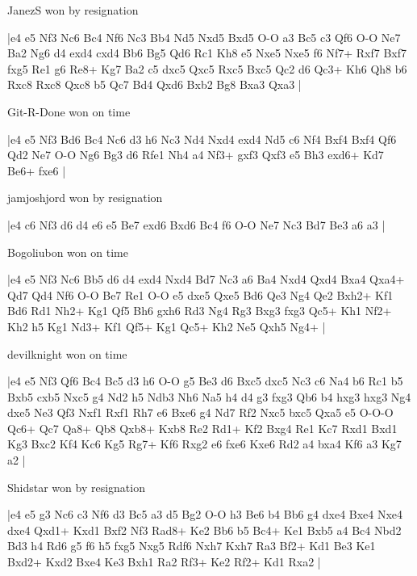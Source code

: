 \showboard

JanezS won by resignation

\makegametitle
|e4 e5 Nf3 Nc6 Bc4 Nf6 Nc3 Bb4 Nd5 Nxd5 Bxd5 O-O a3 Bc5 c3 Qf6 O-O Ne7 Ba2 Ng6 d4 exd4 cxd4 Bb6 Bg5 Qd6 Rc1 Kh8 e5 Nxe5 Nxe5 f6 Nf7+ Rxf7 Bxf7 fxg5 Re1 g6 Re8+ Kg7 Ba2 c5 dxc5 Qxc5 Rxc5 Bxc5 Qc2 d6 Qc3+ Kh6 Qh8 b6 Rxc8 Rxc8 Qxc8 b5 Qc7 Bd4 Qxd6 Bxb2 Bg8 Bxa3 Qxa3  |

\showboard

Git-R-Done won on time

\makegametitle
|e4 e5 Nf3 Bd6 Bc4 Nc6 d3 h6 Nc3 Nd4 Nxd4 exd4 Nd5 c6 Nf4 Bxf4 Bxf4 Qf6 Qd2 Ne7 O-O Ng6 Bg3 d6 Rfe1 Nh4 a4 Nf3+ gxf3 Qxf3 e5 Bh3 exd6+ Kd7 Be6+ fxe6  |

\showboard

jamjoshjord won by resignation

\makegametitle
|e4 c6 Nf3 d6 d4 e6 e5 Be7 exd6 Bxd6 Bc4 f6 O-O Ne7 Nc3 Bd7 Be3 a6 a3  |

\showboard

Bogoliubon won on time

\makegametitle
|e4 e5 Nf3 Nc6 Bb5 d6 d4 exd4 Nxd4 Bd7 Nc3 a6 Ba4 Nxd4 Qxd4 Bxa4 Qxa4+ Qd7 Qd4 Nf6 O-O Be7 Re1 O-O e5 dxe5 Qxe5 Bd6 Qe3 Ng4 Qe2 Bxh2+ Kf1 Bd6 Rd1 Nh2+ Kg1 Qf5 Bh6 gxh6 Rd3 Ng4 Rg3 Bxg3 fxg3 Qc5+ Kh1 Nf2+ Kh2 h5 Kg1 Nd3+ Kf1 Qf5+ Kg1 Qc5+ Kh2 Ne5 Qxh5 Ng4+  |

\showboard

devilknight won on time

\makegametitle
|e4 e5 Nf3 Qf6 Bc4 Bc5 d3 h6 O-O g5 Be3 d6 Bxc5 dxc5 Nc3 c6 Na4 b6 Rc1 b5 Bxb5 cxb5 Nxc5 g4 Nd2 h5 Ndb3 Nh6 Na5 h4 d4 g3 fxg3 Qb6 b4 hxg3 hxg3 Ng4 dxe5 Ne3 Qf3 Nxf1 Rxf1 Rh7 e6 Bxe6 g4 Nd7 Rf2 Nxc5 bxc5 Qxa5 e5 O-O-O Qc6+ Qc7 Qa8+ Qb8 Qxb8+ Kxb8 Re2 Rd1+ Kf2 Bxg4 Re1 Kc7 Rxd1 Bxd1 Kg3 Bxc2 Kf4 Kc6 Kg5 Rg7+ Kf6 Rxg2 e6 fxe6 Kxe6 Rd2 a4 bxa4 Kf6 a3 Kg7 a2  |

\showboard

Shidstar won by resignation

\makegametitle
|e4 e5 g3 Nc6 c3 Nf6 d3 Bc5 a3 d5 Bg2 O-O h3 Be6 b4 Bb6 g4 dxe4 Bxe4 Nxe4 dxe4 Qxd1+ Kxd1 Bxf2 Nf3 Rad8+ Ke2 Bb6 b5 Bc4+ Ke1 Bxb5 a4 Bc4 Nbd2 Bd3 h4 Rd6 g5 f6 h5 fxg5 Nxg5 Rdf6 Nxh7 Kxh7 Ra3 Bf2+ Kd1 Be3 Ke1 Bxd2+ Kxd2 Bxe4 Ke3 Bxh1 Ra2 Rf3+ Ke2 Rf2+ Kd1 Rxa2  |

